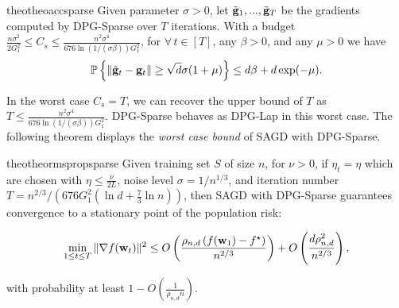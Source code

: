 \documentclass[11pt]{article}
\begin{document}
\begin{restatable}{theo}{theoaccsparse}
\label{thm: acc_sparse}
Given parameter $\sigma > 0$, let $\tilde {\mathbf{g}}_1,...,  \tilde {\mathbf{g}}_T$ be the gradients computed by DPG-Sparse over $T$ iterations. With a budget $ \frac{n\sigma^2}{2G_1^2} \leq C_{s} \leq\frac{n^2 \sigma^4}{676 \ln(1/(\sigma \beta))G_1^2}$, for $\forall\, t \in [T]$, any $\beta > 0$, and any $\mu > 0$ we have 
        \begin{equation*}
    \mathbb{P}\left\{\|\tilde {\mathbf{g}}_t - \mathbf{g}_t\| \geq \sqrt{d}\sigma(1+\mu)\right\} \leq d\beta + d\exp(-\mu).
    \end{equation*}
\end{restatable}


In the worst case $C_{s} = T$, we can recover the upper bound of $T$ as $T \leq \frac{n^2 \sigma^4}{676 \ln(1/(\sigma \beta))G_1^2}$. DPG-Sparse behaves as DPG-Lap in this worst case.
The following theorem displays the \emph{worst case bound} of SAGD with DPG-Sparse.
    
\begin{restatable}{theo}{theormspropsparse}
\label{thm: main_rmsprop_sparse}
 Given training set $S$ of size $n$, for $\nu >0$, if $\eta_t = \eta$ which are chosen with $\eta \leq \frac{\nu}{2L}$, noise level $\sigma = 1/n^{1/3}$, and iteration number $T = n^{2/3}/\left(676G_1^2(\ln d + \frac{7}{3}\ln n)\right)$, then SAGD with DPG-Sparse  guarantees convergence to a stationary point of the population risk:
  \begin{small}
\begin{equation*}
 \min_{1\leq t\leq T}\|\nabla f(\mathbf{w}_t)\|^2 \leq
 O \left( \frac{\rho_{n,d} \left(f(\mathbf{w}_1) - f^\star \right)}{n^{2/3}} \right) + O \left( \frac{d \rho_{n,d}^2}{n^{2/3}}\right),
\end{equation*}
\end{small}
with probability at least $1-O\left(\frac{1}{\rho_{n,d} n}\right)$.
\end{restatable} 
\end{document}
